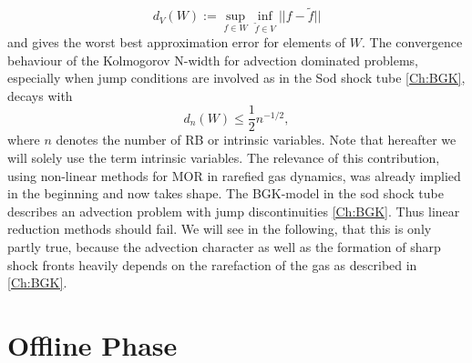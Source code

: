 \begin{equation}
	d_{V}(W):= \sup_{f \in W} \inf_{\tilde{f} \in V} ||f-\tilde{f}||
\end{equation}
and gives the worst best approximation error for elements of \(W\). The convergence behaviour of the Kolmogorov N-width for advection dominated problems, especially when jump conditions are involved as in the Sod shock tube \cref{Ch:BGK}, decays with
\begin{equation}
	d_n(W) \leq \frac{1}{2} n^{-1/2},
	\label{Eq:KolmoAdv}
\end{equation}
where \(n\) denotes the number of RB or intrinsic variables. Note that hereafter we will solely use the term intrinsic variables\cite{ohlberger2015reduced}. The relevance of this contribution, using non-linear methods for MOR in rarefied gas dynamics, was already implied in the beginning and now takes shape. The BGK-model in the sod shock tube describes an advection problem with jump discontinuities \cref{Ch:BGK}. Thus linear reduction methods should fail. We will see in the following, that this is only partly true, because the advection character as well as the formation of sharp shock fronts heavily depends on the rarefaction of the gas as described in \cref{Ch:BGK}.
\section{Offline Phase}
